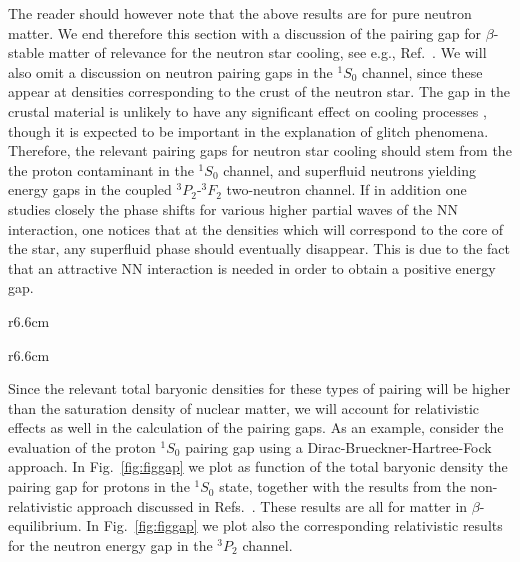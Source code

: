 The reader should however note that the above results are
for pure neutron matter. We end therefore this section
with a discussion of the pairing gap for $\beta$-stable
matter of relevance for the neutron star cooling, see e.g.,
Ref.\ \cite{report}.
We will also omit a discussion on neutron pairing gaps in the
$^1S_0$ channel, since these appear at densities corresponding 
to the crust of the neutron star. The gap in the crustal material 
is unlikely
to have any significant effect on cooling processes \cite{pr95}, 
though
it is expected to be important in the explanation 
of glitch phenomena.
Therefore, the relevant pairing gaps for neutron star cooling
should stem from the 
the proton contaminant 
in the $^1S_0$ channel, and superfluid neutrons yielding energy gaps 
in the coupled $^3P_2$-$^3F_2$ two-neutron channel. 
If in addition one studies closely the phase shifts for
various higher partial waves of the NN interaction, one notices
that at the densities which will correspond to the  
core of the star, any superfluid 
phase should eventually disappear. This is due to the fact that
an attractive NN interaction is needed in order to
obtain a positive energy gap.
\begin{wrapfigure}{r}{6.6cm}   %
          {\epsfxsize=10pc }
          \caption{Proton pairing in $\beta$-stable matter for 
          the $^1S_0$ partial wave.}
     \label{fig:figgap}
        \end{wrapfigure}
\begin{wrapfigure}{r}{6.6cm}   %
          {\epsfxsize=10pc }
          \caption{Neutron pairing in 
          $\beta$-stable matter for the $^3P_2$
          partial wave.}
     \label{fig:figgap2}
        \end{wrapfigure}
Since the relevant total baryonic densities for these types of
pairing will be higher than the saturation
density of nuclear matter, we will account for relativistic
effects as well in the calculation of the pairing gaps.
As an example, consider the evaluation of the proton
$^1S_0$ pairing gap using a Dirac-Brueckner-Hartree-Fock  approach.
In Fig.\ \ref{fig:figgap} we plot as function of the total baryonic 
density the pairing gap for protons in the $^1S_0$
state, together with the results from the non-relativistic 
approach discussed in  Refs.\
\cite{elga96,eeho96}. 
These results are all 
for matter in $\beta$-equilibrium. In Fig.\ \ref{fig:figgap} 
we plot also the 
corresponding relativistic 
results for the neutron energy gap in the $^3P_2$ channel. 
